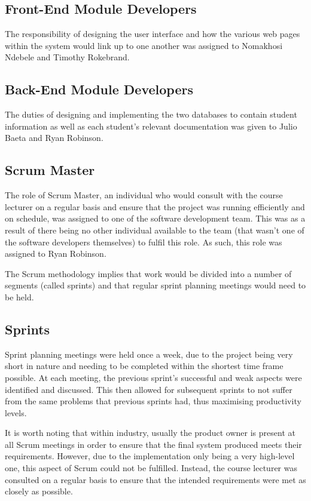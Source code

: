 \documentclass[journal]{IEEEtran}
\begin{document}
\subsection{Front-End Module Developers}

The responsibility of designing the user interface and how the various web pages within the system would link up to one another was assigned to Nomakhosi Ndebele and Timothy Rokebrand.

\subsection{Back-End Module Developers}

The duties of designing and implementing the two databases to contain student information as well as each student's relevant documentation was given to Julio Baeta and Ryan Robinson.

\subsection{Scrum Master}

The role of Scrum Master, an individual who would consult with the course lecturer on a regular basis and ensure that the project was running efficiently and on schedule, was assigned to one of the software development team. This was as a result of there being no other individual available to the team (that wasn't one of the software developers themselves) to fulfil this role. As such, this role was assigned to Ryan Robinson.

\hfill \break The Scrum methodology implies that work would be divided into a number of segments (called sprints) and that regular sprint planning meetings would need to be held.

\subsection{Sprints}

Sprint planning meetings were held once a week, due to the project being very short in nature and needing to be completed within the shortest time frame possible. At each meeting, the previous sprint's successful and weak aspects were identified and discussed. This then allowed for subsequent sprints to not suffer from the same problems that previous sprints had, thus maximising productivity levels.

\hfill \break It is worth noting that within industry, usually the product owner is present at all Scrum meetings in order to ensure that the final system produced meets their requirements. However, due to the implementation only being a very high-level one, this aspect of Scrum could not be fulfilled. Instead, the course lecturer was consulted on a regular basis to ensure that the intended requirements were met as closely as possible.
\end{document}
